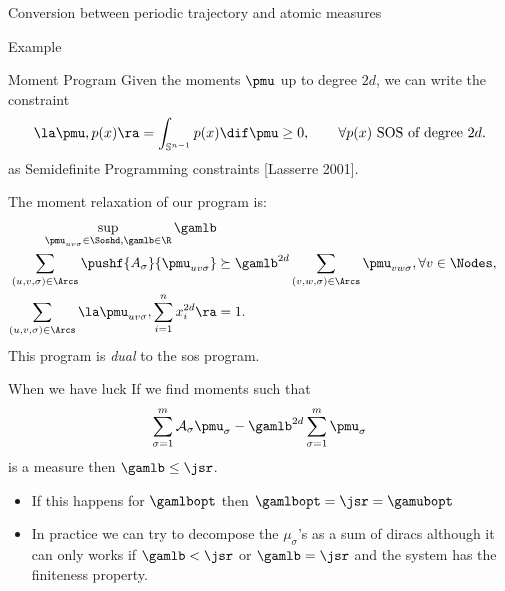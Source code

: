 \documentclass{beamer}
\begin{document}
\begin{frame}{Conversion between periodic trajectory and atomic measures}
\begin{block}{Example}
\begin{center}
  \end{center}
      \end{block}
  \end{frame}


  \begin{frame}{Moment Program}
      Given the moments $\pmu$ up to degree $2d$,
      we can write the constraint
      \[
          \la \pmu, p(x) \ra = \int_{\mathbb{S}^{n-1}} p(x) \dif \pmu \geq 0, \qquad \forall p(x) \text{ SOS of degree }2d.
      \]
      as Semidefinite Programming constraints [Lasserre 2001].

      The moment relaxation of our program is:
      \begin{align}
          \notag
          \sup_{\pmu_{uv\sigma} \in \Soshd, \gamlb \in \R} \gamlb\\
          \notag
          \sum_{(u,v,\sigma) \in \Arcs} \pushf{A_\sigma}{\pmu_{uv\sigma}} & \succeq \gamlb^{2d} \sum_{(v,w,\sigma) \in \Arcs} \pmu_{vw\sigma}, \forall v \in \Nodes,\\
          \notag
          \sum_{(u,v,\sigma) \in \Arcs} \la \pmu_{uv\sigma}, \sum_{i=1}^n x_i^{2d} \ra & = 1.
      \end{align}
      This program is \emph{dual} to the sos program.
  \end{frame}

  \begin{frame}{When we have luck}
      If we find moments such that
      \[ \sum_{\sigma=1}^m \mathcal{A}_\sigma \pmu_\sigma - \gamlb^{2d} \sum_{\sigma = 1}^m \pmu_\sigma \]
      is a measure then $\gamlb \leq \jsr$.

      \begin{itemize}
          \item If this happens for $\gamlbopt$ then $\gamlbopt = \jsr = \gamubopt$
          \item In practice we can try to decompose the $\mu_\sigma$'s as a sum of diracs although it can only works if $\gamlb < \jsr$ or $\gamlb = \jsr$ and the system has the finiteness property.
      \end{itemize}
  \end{frame}
\end{document}
